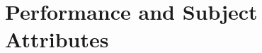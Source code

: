 \documentclass[../main.tex]{subfiles}
\begin{document}



\section{Performance and Subject Attributes}
\end{document}
